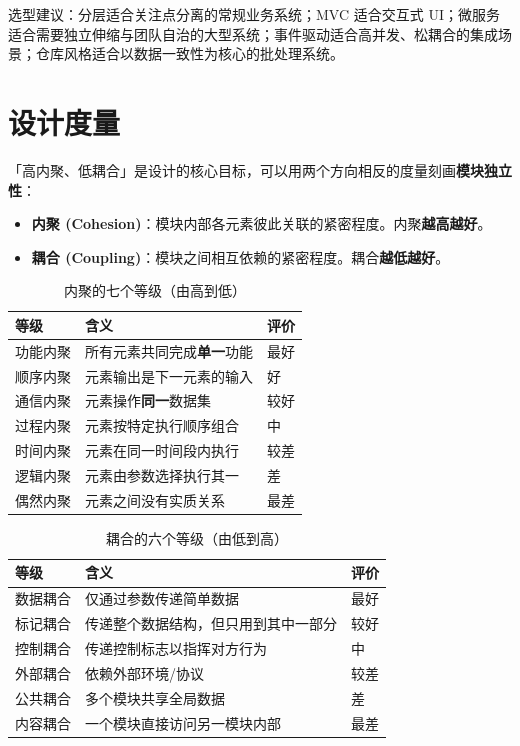 选型建议：分层适合关注点分离的常规业务系统；MVC 适合交互式 UI；微服务适合需要独立伸缩与团队自治的大型系统；事件驱动适合高并发、松耦合的集成场景；仓库风格适合以数据一致性为核心的批处理系统。

\section{设计度量}

「高内聚、低耦合」是设计的核心目标，可以用两个方向相反的度量刻画\textbf{模块独立性}：

\begin{itemize}
    \item \textbf{内聚 (Cohesion)}：模块内部各元素彼此关联的紧密程度。内聚\textbf{越高越好}。
    \item \textbf{耦合 (Coupling)}：模块之间相互依赖的紧密程度。耦合\textbf{越低越好}。
\end{itemize}

\begin{table}[H]
\centering
\caption{内聚的七个等级（由高到低）}
\begin{tabulary}{\textwidth}{LLL}
\toprule
等级 & 含义 & 评价 \\
\midrule
功能内聚 & 所有元素共同完成\textbf{单一}功能 & 最好 \\
顺序内聚 & 元素输出是下一元素的输入 & 好 \\
通信内聚 & 元素操作\textbf{同一}数据集 & 较好 \\
过程内聚 & 元素按特定执行顺序组合 & 中 \\
时间内聚 & 元素在同一时间段内执行 & 较差 \\
逻辑内聚 & 元素由参数选择执行其一 & 差 \\
偶然内聚 & 元素之间没有实质关系 & 最差 \\
\bottomrule
\end{tabulary}
\end{table}

\begin{table}[H]
\centering
\caption{耦合的六个等级（由低到高）}
\begin{tabulary}{\textwidth}{LLL}
\toprule
等级 & 含义 & 评价 \\
\midrule
数据耦合 & 仅通过参数传递简单数据 & 最好 \\
标记耦合 & 传递整个数据结构，但只用到其中一部分 & 较好 \\
控制耦合 & 传递控制标志以指挥对方行为 & 中 \\
外部耦合 & 依赖外部环境/协议 & 较差 \\
公共耦合 & 多个模块共享全局数据 & 差 \\
内容耦合 & 一个模块直接访问另一模块内部 & 最差 \\
\bottomrule
\end{tabulary}
\end{table}


